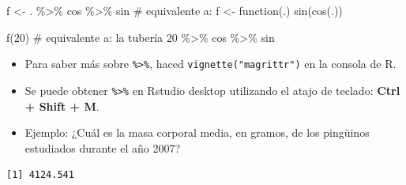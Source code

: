 \documentclass[
  letterpaper,
  DIV=11,
  numbers=noendperiod]{scrreprt}
\newenvironment{Shaded}{\begin{snugshade}}{\end{snugshade}}
\newcommand{\AttributeTok}[1]{\textcolor[rgb]{0.40,0.45,0.13}{#1}}
\newcommand{\CommentTok}[1]{\textcolor[rgb]{0.37,0.37,0.37}{#1}}
\newcommand{\DecValTok}[1]{\textcolor[rgb]{0.68,0.00,0.00}{#1}}
\newcommand{\FunctionTok}[1]{\textcolor[rgb]{0.28,0.35,0.67}{#1}}
\newcommand{\NormalTok}[1]{\textcolor[rgb]{0.00,0.23,0.31}{#1}}
\newcommand{\OtherTok}[1]{\textcolor[rgb]{0.00,0.23,0.31}{#1}}
\newcommand{\SpecialCharTok}[1]{\textcolor[rgb]{0.37,0.37,0.37}{#1}}
\begin{document}
\begin{Shaded}
\begin{Highlighting}[]
\NormalTok{f }\OtherTok{\textless{}{-}}\NormalTok{ . }\SpecialCharTok{\%\textgreater{}\%}\NormalTok{ cos }\SpecialCharTok{\%\textgreater{}\%}\NormalTok{ sin }\CommentTok{\# equivalente a: f \textless{}{-} function(.) sin(cos(.))}
\end{Highlighting}
\end{Shaded}

\begin{Shaded}
\begin{Highlighting}[]
\FunctionTok{f}\NormalTok{(}\DecValTok{20}\NormalTok{) }\CommentTok{\# equivalente a: la tubería 20 \%\textgreater{}\% cos \%\textgreater{}\% sin}
\end{Highlighting}
\end{Shaded}

\begin{itemize}
\item
  Para saber más sobre \texttt{\%\textgreater{}\%}, haced
  \texttt{vignette("magrittr")} en la consola de R.
\item
  Se puede obtener \texttt{\%\textgreater{}\%} en Rstudio desktop
  utilizando el atajo de teclado: \textbf{Ctrl + Shift + M}.
\item
  {Ejemplo:} ¿Cuál es la masa corporal media, en gramos, de los
  pingüinos estudiados durante el año 2007?
\end{itemize}

\begin{Shaded}
\end{Shaded}

\begin{verbatim}
[1] 4124.541
\end{verbatim}

\begin{Shaded}
\end{Shaded}
\end{document}
